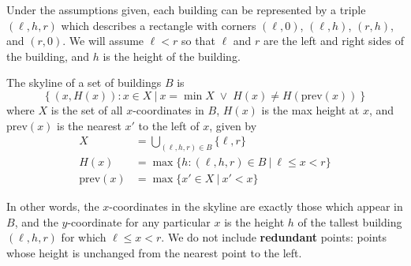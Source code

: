 \begin{gram}[Buildings]
Under the assumptions given, each building can be represented by a triple
$(\ell,h,r)$ which describes a rectangle with corners $(\ell, 0)$, $(\ell, h)$,
$(r, h)$, and $(r, 0)$. We will assume $\ell < r$ so that $\ell$ and $r$ are
the left and right sides of the building, and $h$ is the height of the building.
\end{gram}

\begin{definition}
The skyline of a set of buildings $B$ is
\[ \left\{ (x, H(x)) : x \in X\ \Big|\
   x = \min X \;\lor\; H(x) \neq H(\text{prev}(x)) \right\} \]
where $X$ is the set of all $x$-coordinates in $B$, $H(x)$ is the max height
at $x$, and $\text{prev}(x)$ is the nearest $x'$ to the left of $x$, given by
\begin{align*}
  X &= \bigcup_{(\ell,h,r) \in B} \{\ell, r\} \\
  H(x) &= \max \big\{ h : (\ell, h, r) \in B\ \big|\ \ell \leq x < r \big\} \\
  \text{prev}(x) &= \max \big\{ x' \in X\ \big|\ x' < x \big\}
\end{align*}

In other words, the $x$-coordinates in the skyline are exactly those which
appear in $B$, and the $y$-coordinate for any particular $x$ is the height $h$
of the tallest building $(\ell, h, r)$ for which $\ell \leq x < r$. We do not
include \textbf{redundant} points: points whose height is unchanged from the
nearest point to the left.
\end{definition}

